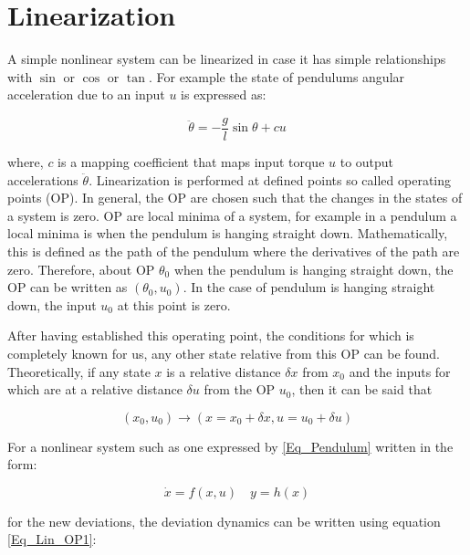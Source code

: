 \chapter{Linearization} \label{Ch_Linerization}

A simple nonlinear system can be linearized in case it has simple relationships with $\sin$ or $\cos$ or $\tan$. For example the state of pendulums angular acceleration due to an input $u$ is expressed as:

\begin{equation} \label{Eq_Pendulum}
	\ddot{\theta} = -\frac{g}{l}\sin{\theta} + c u
\end{equation}

where, $c$ is a mapping coefficient that maps input torque $u$ to output accelerations $\ddot{\theta}$. Linearization is performed at defined points so called operating points (OP). In general, the OP are chosen such that the changes in the states of a system is zero. OP are local minima of a system, for example in a pendulum a local minima is when the pendulum is hanging straight down. Mathematically, this is defined as the path of the pendulum where the derivatives of the path are zero. Therefore, about OP $\theta_0$ when the pendulum is hanging straight down, the OP can be written as $(\theta_0,u_0)$. In the case of pendulum is hanging straight down, the input $u_0$ at this point is zero.

After having established this operating point, the conditions for which is completely known for us, any other state relative from this OP can be found. Theoretically, if any state $x$ is a relative distance $\delta x$ from $x_0$ and the inputs for which are at a relative distance $\delta u$ from the OP $u_0$, then it can be said that

\begin{equation} \label{Eq_Lin_OP1}
	(x_0,u_0) \rightarrow (x = x_0 + \delta x, u = u_0 + \delta u)
\end{equation}

For a nonlinear system such as one expressed by \eqref{Eq_Pendulum} written in the form:

\begin{equation}
	\dot{x} = f(x,u) \quad y = h(x)
\end{equation}

for the new deviations, the deviation dynamics can be written using equation \eqref{Eq_Lin_OP1}:

